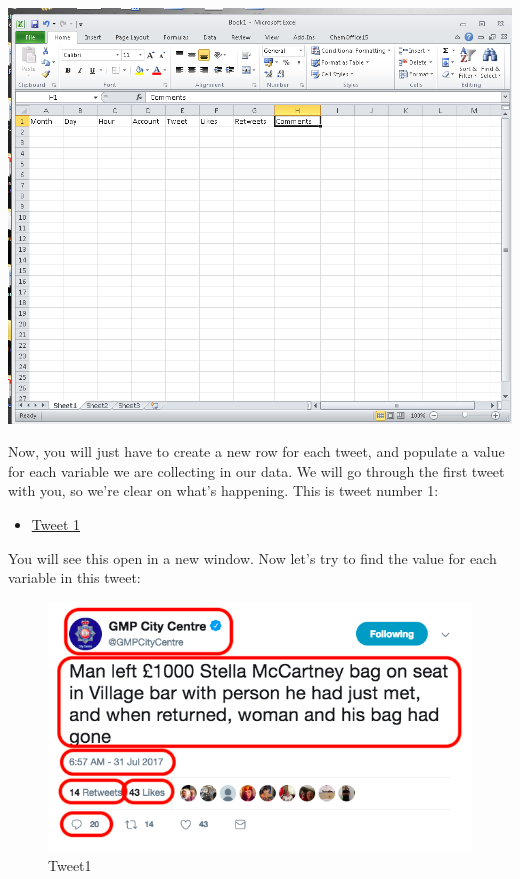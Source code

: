 \documentclass[
]{book}
\providecommand{\tightlist}{%
  \setlength{\itemsep}{0pt}\setlength{\parskip}{0pt}}
\begin{document}
\includegraphics{imgs/column_headers_tweets.png}

Now, you will just have to create a new row for each tweet, and populate a value for each variable we are collecting in our data. We will go through the first tweet with you, so we're clear on what's happening.
This is tweet number 1:

\begin{itemize}
\tightlist
\item
  \href{https://twitter.com/GMPCityCentre/status/891900693585506304}{Tweet 1}
\end{itemize}

You will see this open in a new window. Now let's try to find the value for each variable in this tweet:

\begin{figure}
\centering
\includegraphics{imgs/tweet1.png}
\caption{Tweet1}
\end{figure}
\end{document}
